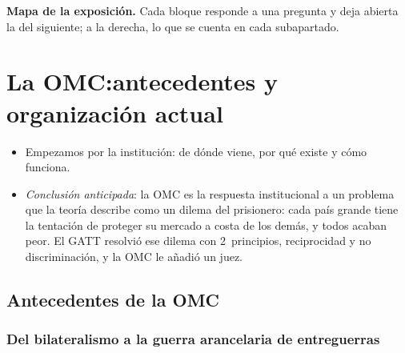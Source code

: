 \documentclass[11pt]{article}
\begin{document}
\begin{anotaciones}
\textbf{Mapa de la exposición.} Cada bloque responde a una pregunta y deja abierta la del siguiente; a la derecha, lo que se cuenta en cada subapartado.
\begin{infografiacaja}
\caption{Mapa del tema: la pregunta de cada bloque y el hilo que los une}\label{figu:mapa-tema}
\end{infografiacaja}
\end{anotaciones}



\section{La OMC:\cortetitulo antecedentes y organización actual}\label{sec:omc}

\begin{itemize}
\item Empezamos por la institución: de dónde viene, por qué existe y cómo funciona.
\item \emph{Conclusión anticipada}: la OMC es la respuesta institucional a un problema que la teoría describe como un dilema del prisionero: cada país grande tiene la tentación de proteger su mercado a costa de los demás, y todos acaban peor. El GATT resolvió ese dilema con 2~principios, reciprocidad y no discriminación, y la OMC le añadió un juez.
\end{itemize}

\subsection{Antecedentes de la OMC}\label{sec:antecedentes}

\subsubsection{Del bilateralismo a la guerra arancelaria de entreguerras}\label{sec:entreguerras}
\end{document}
